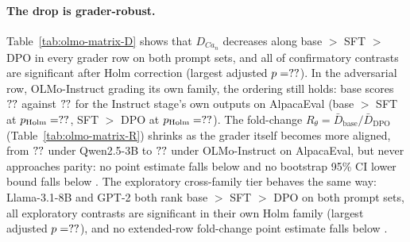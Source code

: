 \begin{table}[h]
\centering
\caption{Mean per-prompt $D_{Ca_n}$ for every grader $\theta$ (rows) scoring every OLMo-2-7B generation stage (columns), on both length-matched prompt sets. Within each prompt-set panel, the first five rows are the pre-registered grader set: the cross-family configuration reported in Section~\ref{sec:rlhf-experiment}, then the in-family graders, including each aligned stage scoring its own outputs on the diagonal. The two rows after the gap are the exploratory cross-family extension; a row-specific $n$ marks GPT-2's context-feasible AlpacaEval subset.}
\label{tab:olmo-matrix-D}
\small
{}
\end{table}

\paragraph{The drop is grader-robust.}
Table~\ref{tab:olmo-matrix-D} shows that $D_{Ca_n}$ decreases along base $>$ SFT $>$ DPO in every grader row on both prompt sets, and all \olmoMxNContrastsSig{} of \olmoMxNContrasts{} confirmatory contrasts are significant after Holm correction (largest adjusted $p = ??$).
In the adversarial row, OLMo-Instruct grading its own family, the ordering still holds: base scores $??$ against $??$ for the Instruct stage's own outputs on AlpacaEval (base $>$ SFT at $p_{\mathrm{Holm}} = ??$, SFT $>$ DPO at $p_{\mathrm{Holm}} = ??$).
The fold-change $R_\theta = \bar{D}_{\mathrm{base}} / \bar{D}_{\mathrm{DPO}}$ (Table~\ref{tab:olmo-matrix-R}) shrinks as the grader itself becomes more aligned, from $??$ under Qwen2.5-3B to $??$ under OLMo-Instruct on AlpacaEval, but never approaches parity: no point estimate falls below \olmoMxMinR{} and no bootstrap 95\% CI lower bound falls below \olmoMxMinRLo{}.
The exploratory cross-family tier behaves the same way: Llama-3.1-8B and GPT-2 both rank base $>$ SFT $>$ DPO on both prompt sets, all \olmoMxNContrastsExt{} exploratory contrasts are significant in their own Holm family (largest adjusted $p = ??$), and no extended-row fold-change point estimate falls below \olmoMxMinRExt{}.

